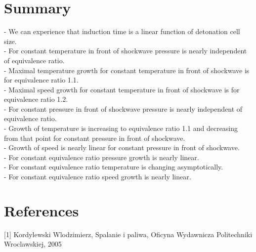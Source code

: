 \documentclass[11pt,a4paper]{article}
\begin{document}
\section{Summary}\label{sec:summary}
- We can experience that induction time is a linear function of detonation cell size.\\
- For constant temperature in front of shockwave pressure is nearly independent of equivalence ratio.\\
- Maximal temperature growth for constant temperature in front of shockwave is for equivalence ratio 1.1.\\
- Maximal speed growth for constant temperature in front of shockwave is for equivalence ratio 1.2.\\
- For constant pressure in front of shockwave pressure is nearly independent of equivalence ratio.\\
- Growth of temperature is increasing to equivalence ratio 1.1 and decreasing from that point for constant pressure in front of shockwave.\\
- Growth of speed is nearly linear for constant pressure in front of shockwave.\\
- For constant equivalence ratio pressure growth is nearly linear.\\
- For constant equivalence ratio temperature is changing asymptotically.\\
- For constant equivalence ratio speed growth is nearly linear.\\

\section{References}\label{sec:refs}

[1] Kordylewski Wlodzimierz, Spalanie i paliwa, Oficyna Wydawnicza Politechniki Wroclawskiej, 2005
\end{document}
